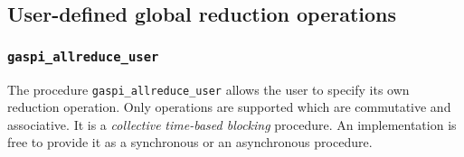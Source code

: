 \documentclass[a4paper]{article}
\newcommand{\zsep}[1]{#1}
\newcommand{\gaspiprefix}{gaspi}
\newcommand{\function}[1]{{\tt #1}}
\newcommand{\gaspifunction}[1]{\function{\protect\zsep{\gaspiprefix\_#1}}}
\newcommand{\gaspisemantic}[1]{{\emph{#1}}}
\begin{document}
\subsection{User-defined global reduction operations}

\subsubsection{\gaspifunction{allreduce\_user}}

The procedure \gaspifunction{allreduce\_user} allows the user to specify its
own reduction operation. Only operations are supported which are
commutative and associative. It is a \gaspisemantic{collective}
\gaspisemantic{time-based blocking} procedure.  An implementation is
free to provide it as a synchronous or an asynchronous procedure. 
\end{document}
